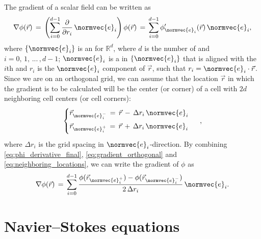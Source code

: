 The gradient of a scalar field can be written as
%
\begin{equation} \label{eq:gradient_orthogonal}
\nabla\phi(\vec{r}) \,=\, \left(\sum_{i=0}^{d-1}\frac{\partial}{\partial r_i}\,\normvec{e}_i\right) \phi(\vec{r}) \,=\, \sum_{i=0}^{d-1}\phi'_{\normvec{e}_i}(\vec{r})\,\normvec{e}_i,
\end{equation}
%
where $\{\normvec{e}_i\}$ is an  for $\mathbb{R}^d$, where $d$ is the number of \dimensions and $i = 0,\,1,\,...\,,d-1$; $\normvec{e}_i$ is a  in $\{\normvec{e}_i\}$ that is aligned with the $i$th  and $r_i$ is the $\normvec{e}_i$ component of $\vec{r}$,
such that $r_i = \normvec{e}_i\cdot\vec{r}$. Since we are on an orthogonal grid, we can assume that the location $\vec{r}$ in which the gradient is to be calculated will be the center (or corner) of a cell with $2d$ neighboring cell centers (or cell corners):
%
\begin{equation} \label{eq:neighboring_locations}
\begin{cases}
\vec{r}_{\normvec{e}_i^-} \,=\, \vec{r} \,-\, \Delta r_i\,\normvec{e}_i\\[1ex]
\vec{r}_{\normvec{e}_i^+} \,=\, \vec{r} \,+\, \Delta r_i\,\normvec{e}_i\\[1ex]
\end{cases}\ ,
\end{equation}
%
where $\Delta r_i$ is the grid spacing in $\normvec{e}_i$-direction. By combining  \ref{eq:phi_derivative_final}, \ref{eq:gradient_orthogonal} and \ref{eq:neighboring_locations}, we can write the gradient of $\phi$ as
%
\begin{equation} \label{eq:gradient_final}
\nabla\phi(\vec{r}) \,=\,
\sum_{i=0}^{d-1}\frac{\phi(\vec{r}_{\normvec{e}_i^+})-\phi(\vec{r}_{\normvec{e}_i^-})}{2\,\Delta r_i}\,\normvec{e}_i.
\end{equation}

\section{Navier--Stokes equations}
\label{sec:ns_equations}

